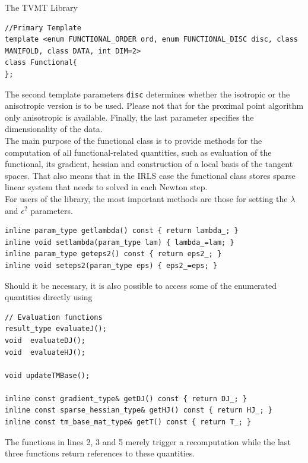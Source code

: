 \begin{chapter}{The TVMT Library}
\cppinline
\begin{lstlisting}
//Primary Template
template <enum FUNCTIONAL_ORDER ord, enum FUNCTIONAL_DISC disc, class MANIFOLD, class DATA, int DIM=2>
class Functional{
};
\end{lstlisting}

The second template parameters \texttt{disc} determines whether the isotropic or the anisotropic version is to be used. Please not that for the proximal point algorithm only
anisotropic is available. Finally, the last parameter specifies the dimensionality of the data. \\
The main purpose of the functional class is to provide methods for the computation of all functional-related quantities, such as evaluation of the functional, its gradient,
hessian and construction of a local basis of the tangent spaces. That also means that in the IRLS case the functional class stores sparse linear system that needs to solved
in each Newton step.\\

For users of the library, the most important methods are those for setting the $\lambda$ and $\epsilon^2$ parameters.
\cppinline
\begin{lstlisting}
inline param_type getlambda() const { return lambda_; }
inline void setlambda(param_type lam) { lambda_=lam; }
inline param_type geteps2() const { return eps2_; }
inline void seteps2(param_type eps) { eps2_=eps; }
\end{lstlisting}

Should it be necessary, it is also possible to access some of the enumerated quantities directly using
\cppinline
\begin{lstlisting}
// Evaluation functions
result_type evaluateJ();
void  evaluateDJ();
void  evaluateHJ();
 
void updateTMBase();

inline const gradient_type& getDJ() const { return DJ_; }
inline const sparse_hessian_type& getHJ() const { return HJ_; }
inline const tm_base_mat_type& getT() const { return T_; }
\end{lstlisting}
The functions in lines 2, 3 and 5 merely trigger a recomputation while the last three functions return references to these quantities.




\end{chapter}
